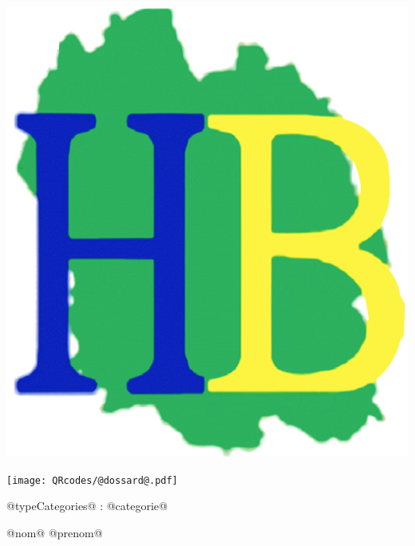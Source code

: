 \Huge

\begin{block} %
{}\hfill {}
{}\hfill {}
\begin{minipage}{0.15\linewidth}
\includegraphics[width=\textwidth]{logo-HB.png}
\end{minipage}
{}\hfill {}



\begin{minipage}{0.48\linewidth}
\texttt{[image: QRcodes/@dossard@.pdf]}
\end{minipage}
\begin{minipage}{0.5\linewidth}
{}\hfill {}
{}\hfill {}
\end{minipage}


\vspace{0.5cm}
\begin{minipage}{0.47\linewidth}
@typeCategories@ : @categorie@
\end{minipage}
\hfill {}
\begin{minipage}{0.5\linewidth}
@nom@ @prenom@
\end{minipage}
\hfill {}

\end{block}

\vfill


\vfill
